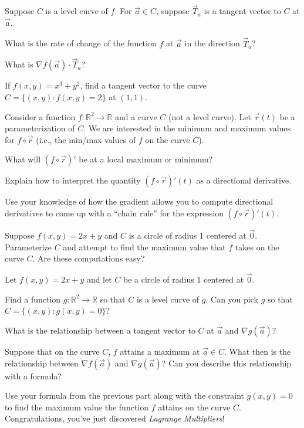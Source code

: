 \documentclass{problemset}
\newcommand{\R}{\mathbb{R}}
\begin{document}
	\question
	Suppose $C$ is a level curve of $f$.  For $\vec a\in C$, suppose $\vec T_a$ is a tangent vector to
	$C$ at $\vec a$.
	\begin{parts}
		\item What is the rate of change of the function $f$ at $\vec a$ in the direction $\vec T_a$?
		\item What is $\nabla f(\vec a)\cdot \vec T_a$?
		\item If $f(x,y)=x^3+y^2$, find a tangent vector to the curve $C=\{(x,y):f(x,y)=2\}$ at $(1,1)$.
	\end{parts}

	\question
	Consider a function $f:\R^2\to \R$ and a curve $C$ (not a level curve).  Let $\vec r(t)$
	be a parameterization of $C$.  We are interested in the minimum and maximum values for 
	$f\circ \vec r$ (i.e., the min/max values of $f$ on the curve $C$).
	\begin{parts}
		\item What will $(f\circ \vec r)'$ be at a local maximum or minimum?
		\item Explain how to interpret the quantity $(f\circ \vec r)'(t)$
			as a directional derivative.
		\item Use your knowledge of how the gradient allows you to compute directional derivatives
			to come up with a ``chain rule'' for the expression $(f\circ \vec r)'(t)$.
		\item Suppose $f(x,y) = 2x+y$ and $C$ is a circle of radius 1 centered at $\vec 0$.
			Parameterize $C$ and attempt to find the maximum value that $f$ takes on the curve $C$.
			Are these computations easy?
	\end{parts}

	\question
	Let $f(x,y)=2x+y$ and let $C$ be a circle of radius 1 centered at $\vec 0$.
	\begin{parts}
		\item Find a function $g:\R^2\to \R$ so that $C$ is a level curve of $g$.
			Can you pick $g$ so that $C=\{(x,y): g(x,y)=0\}$?
		\item What is the relationship between a tangent vector to $C$ at $\vec a$ and
			$\nabla g(\vec a)$?
		\item Suppose that on the curve $C$, $f$ attains 
			a maximum at $\vec a\in C$. What then is the relationship between 
			$\nabla f(\vec a)$ and $\nabla g(\vec a)$?  Can you describe this relationship
			with a formula?
		\item Use your formula from the previous part along with the constraint $g(x,y)=0$
			to find the maximum value the function $f$ attains on the curve $C$.  Congratulations,
			you've just discovered \emph{Lagrange Multipliers}!

	\end{parts}
\end{document}
